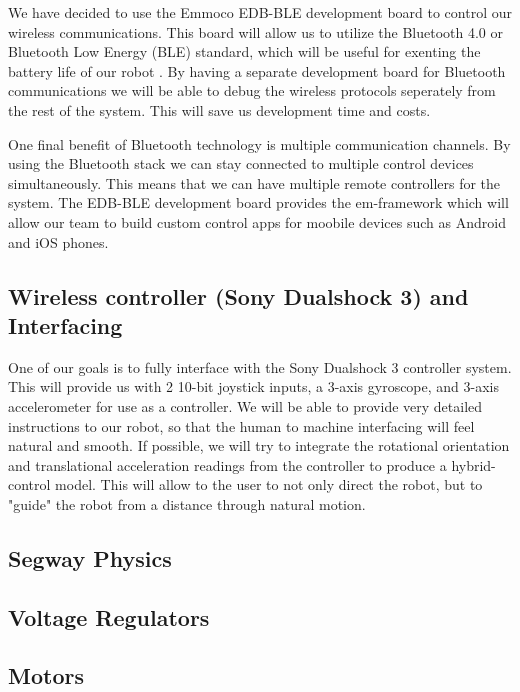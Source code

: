 \documentclass[11pt]{report}
\begin{document}
\begin{spacing}{1.5}
We have decided to use the Emmoco EDB-BLE development board to control our wireless communications.  This board will allow us to utilize the Bluetooth\textsuperscript{\textregistered} 4.0 or Bluetooth\textsuperscript{\textregistered} Low Energy (BLE) standard, which will be useful for exenting the battery life of our robot \cite{Nokia}.  By having a separate development board for Bluetooth\textsuperscript{\textregistered} communications we will be able to debug the wireless protocols seperately from the rest of the system.  This will save us development time and costs.

One final benefit of Bluetooth\textsuperscript{\textregistered} technology is multiple communication channels.  By using the Bluetooth\textsuperscript{\textregistered} stack we can stay connected to multiple control devices simultaneously.  This means that we can have multiple remote controllers for the system.  The EDB-BLE development board provides the em-framework which will allow our team to build custom control apps for moobile devices such as Android and iOS phones.

\subsection*{Wireless controller (Sony Dualshock 3\textsuperscript{\textregistered}) and Interfacing}
One of our goals is to fully interface with the Sony Dualshock 3\textsuperscript{\textregistered} controller system.  This will provide us with 2 10-bit joystick inputs, a 3-axis gyroscope, and 3-axis accelerometer for use as a controller.  We will be able to provide very detailed instructions to our robot, so that the human to machine interfacing will feel natural and smooth.  If possible, we will try to integrate the rotational orientation and translational acceleration readings from the controller to produce a hybrid-control model.  This will allow to the user to not only direct the robot, but to "guide" the robot from a distance through natural motion.

\subsection*{Segway Physics}

\subsection*{Voltage Regulators}

\subsection*{Motors}


\end{spacing}
\end{document}
